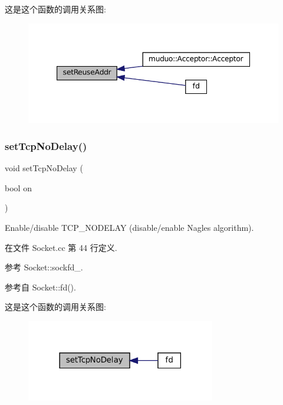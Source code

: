 这是这个函数的调用关系图\+:
\nopagebreak
\begin{figure}[H]
\begin{center}
\leavevmode
\includegraphics[width=347pt]{classmuduo_1_1Socket_add291e612aa85998f66e8dd002a942ff_icgraph}
\end{center}
\end{figure}
\mbox{\label{classmuduo_1_1Socket_a7419d5072b837a2ba3cc5aac85015212}} 
\subsubsection{\texorpdfstring{set\+Tcp\+No\+Delay()}{setTcpNoDelay()}}
{\footnotesize\ttfamily void set\+Tcp\+No\+Delay (\begin{DoxyParamCaption}\item[{bool}]{on }\end{DoxyParamCaption})}

Enable/disable T\+C\+P\+\_\+\+N\+O\+D\+E\+L\+AY (disable/enable Nagle\textquotesingle{}s algorithm). 

在文件 Socket.\+cc 第 44 行定义.



参考 Socket\+::sockfd\+\_\+.



参考自 Socket\+::fd().

这是这个函数的调用关系图\+:
\nopagebreak
\begin{figure}[H]
\begin{center}
\leavevmode
\includegraphics[width=234pt]{classmuduo_1_1Socket_a7419d5072b837a2ba3cc5aac85015212_icgraph}
\end{center}
\end{figure}
\mbox{\label{classmuduo_1_1Socket_a214a4d8c48e77393446932b95ebdf306}} 

